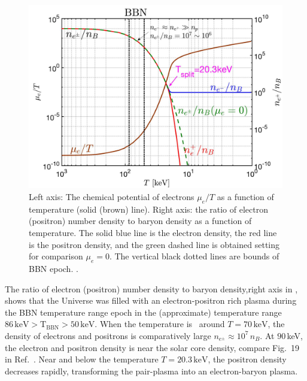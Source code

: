 \begin{figure}
\centerline{\includegraphics[width=0.90\linewidth]{plots/May152023_EPDensity_Chemical}}
\caption{Left axis: The chemical potential of electrons $\mu_e/T$ as a function of temperature (solid (brown) line). Right axis: the ratio of electron (positron) number density to baryon density as a function of temperature. The solid blue line is the electron density, the red line is the positron density, and the green dashed line is obtained setting for comparison $\mu_e=0$. The vertical black dotted lines are bounds of BBN epoch. . }
\label{BBN:Electron}
\end{figure}

The ratio of electron (positron) number density to baryon density,right axis in , shows that the Universe was filled with an electron-positron rich plasma during the BBN temperature range epoch in the (approximate) temperature range $86\,\mathrm{keV}>\mathrm{T_{BBN}}>50\,\mathrm{keV}$. When the temperature is \eg\ around $T=70\,\mathrm{keV}$, the density of electrons and positrons is comparatively large $n_{e^\pm}\approx10^7\,n_B$. At $90$\,keV, the electron and positron density is near the solar core density, compare Fig.~19 in Ref.~\cite{Rafelski:2023emw}. Near and below the temperature $T=20.3\,\mathrm{keV}$, the positron density decreases rapidly, transforming the pair-plasma into an electron-baryon plasma.


